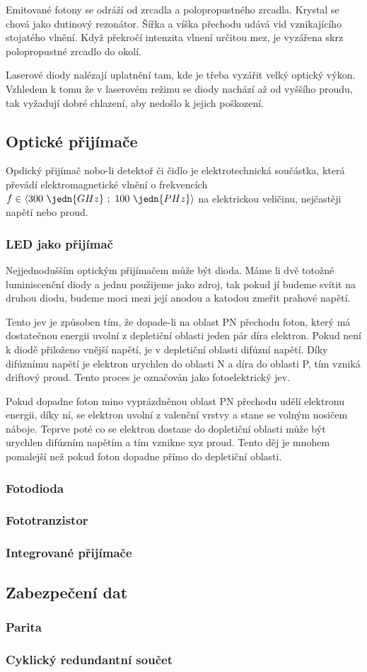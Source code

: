 Emitované fotony se odráží od zrcadla a polopropustného zrcadla.  Krystal se chová jako dutinový rezonátor. Šířka a víška přechodu udává vid vznikajícího stojatého vlnění. Když překročí intenzita vlnení určitou mez, je vyzářena skrz polopropustné zrcadlo do okolí.

Laserové diody nalézají uplatnění tam, kde je třeba vyzářit velký optický výkon. Vzhledem k tomu že v laserovém režimu se diody nachází až od vyššího proudu, tak vyžadují dobré chlazení, aby nedošlo k jejich poškození.

\subsection{Optické přijímače}
Opdický přijímač nobo-li detektoř či čidlo je elektrotechnická součástka, která převádí elektromagnetické vlnění o frekvencích $f \in \langle 300~\jedn{GHz}~;~100~\jedn{PHz} \rangle$ na elektrickou veličinu, nejčastěji napětí nebo proud.

\subsubsection{LED jako přijímač}
Nejjednodušším optickým přijímačem může být  dioda. Máme li dvě totožné luminiscenční diody a jednu použijeme jako zdroj, tak pokud jí budeme svítit na druhou diodu, budeme moci mezi její anodou a katodou zmeřit prahové napětí.

Tento jev je způsoben tím, že dopade-li na oblast PN přechodu foton, který má dostatečnou energii uvolní z depletiční oblasti jeden pár díra elektron. Pokud není k diodě přiloženo vnější napětí, je v depletiční oblasti difúzní napětí. Díky difúznímu napětí je elektron urychlen do oblasti N a díra do oblasti P, tím vzniká driftový proud. Tento proces je označován jako fotoelektrický jev.

Pokud dopadne foton mino vyprázdněnou oblast PN přechodu udělí elektronu energii, díky ní, se elektron uvolní z valenční vrstvy a stane se volným nosičem náboje. Teprve poté co se elektron dostane do dopletiční oblasti může být urychlen difúzním napětím a tím vznikne xyz proud. Tento děj je mnohem pomalejší než pokud foton dopadne přímo do depletiční oblasti.

\subsubsection{Fotodioda}
\subsubsection{Fototranzistor}
\subsubsection{Integrované přijímače}

\subsection{Zabezpečení dat}
\subsubsection{Parita}
\subsubsection{Cyklický redundantní součet}
